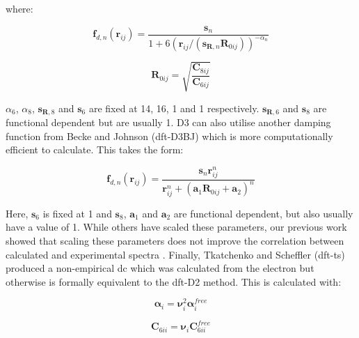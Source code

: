 where:

\begin{equation}
\boldsymbol{f}_{d,n}(\boldsymbol{r}_{ij}) = \frac{\boldsymbol{s}_n}{1 + 6 (\boldsymbol{r}_{ij} / (\boldsymbol{s}_{\boldsymbol{R},n} \boldsymbol{R}_{0ij}))^{-{\alpha}_{n}}} 
\end{equation}

\begin{equation}
\boldsymbol{R}_{0ij} = \sqrt{\frac{\boldsymbol{C}_{8ij}}{\boldsymbol{C}_{6ij}}}
\end{equation}

\({\alpha}_{6}\), \({\alpha}_{8}\), \(\boldsymbol{s}_{\boldsymbol{R},8}\) and \(\boldsymbol{s}_6\) are fixed at 14, 16, 1 and 1 respectively. \(\boldsymbol{s}_{\boldsymbol{R},6}\) and \(\boldsymbol{s}_8\) are functional dependent but are usually 1. D3 can also utilise another damping function from Becke and Johnson\cite{Becke2005} (\acrshort{dft}\nobreakdash-D3BJ) which is more computationally efficient to calculate. This takes the form:

\begin{equation}
\boldsymbol{f}_{d,n}(\boldsymbol{r}_{ij}) = \frac{\boldsymbol{s}_n \boldsymbol{r}_{ij}^n}{\boldsymbol{r}_{ij}^n + (\boldsymbol{a}_1 \boldsymbol{R}_{0ij} + \boldsymbol{a}_2)^n}
\end{equation}

Here, \(\boldsymbol{s}_6\) is fixed at 1 and \(\boldsymbol{s}_8\), \(\boldsymbol{a}_1\) and \(\boldsymbol{a}_2\) are functional dependent, but also usually have a value of 1. While others have scaled these parameters, our previous work showed that scaling these parameters does not improve the correlation between calculated and experimental spectra \DIFdelbegin \DIFdel{~}\DIFdelend \cite{Kendrick2020}.  Finally, Tkatchenko and Scheffler \DIFdelbegin \DIFdel{~}\DIFdelend \cite{Tkatchenko2009} (\acrshort{dft}-\acrshort{ts}) produced a non-empirical \acrshort{dc} which was calculated from the electron \DIFdelbegin {}%
\DIFdelend \DIFaddbegin {}\DIFaddend but otherwise is formally equivalent to the \acrshort{dft}\nobreakdash-D2 method. This is calculated with:

\begin{equation}
\boldsymbol{\alpha}_i = \boldsymbol{\nu}_i^2 \boldsymbol{\alpha}_i^{free}
\end{equation}

\begin{equation}
\boldsymbol{C}_{6ii} = \boldsymbol{\nu}_i \boldsymbol{C}_{6ii}^{free}
\end{equation}

